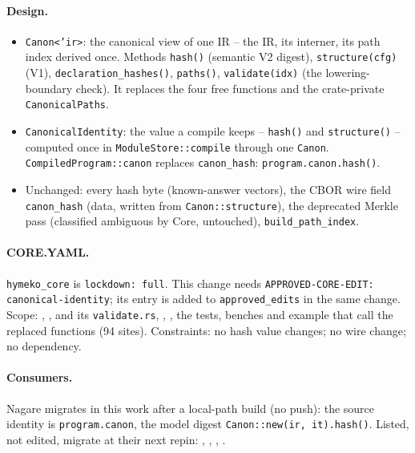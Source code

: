 \documentclass[11pt,a4paper]{article}
\begin{document}
\paragraph{Design.}
\begin{itemize}
\item \texttt{Canon<'ir>}: the canonical view of one IR -- the IR, its interner, its path index
  derived once. Methods \texttt{hash()} (semantic V2 digest), \texttt{structure(cfg)} (V1),
  \texttt{declaration\_hashes()}, \texttt{paths()}, \texttt{validate(idx)} (the lowering-boundary
  check). It replaces the four free functions and the crate-private \texttt{CanonicalPaths}.
\item \texttt{CanonicalIdentity}: the value a compile keeps -- \texttt{hash()} and
  \texttt{structure()} -- computed once in \texttt{ModuleStore::compile} through one \texttt{Canon}.
  \texttt{CompiledProgram::canon} replaces \texttt{canon\_hash}: \texttt{program.canon.hash()}.
\item Unchanged: every hash byte (known-answer vectors), the CBOR wire field \texttt{canon\_hash}
  (data, written from \texttt{Canon::structure}), the deprecated Merkle pass (classified ambiguous
  by Core, untouched), \texttt{build\_path\_index}.
\end{itemize}

\paragraph{CORE.YAML.} \texttt{hymeko\_core} is \texttt{lockdown: full}. This change needs
\texttt{APPROVED-CORE-EDIT: canonical-identity}; its entry is added to \texttt{approved\_edits} in the
same change. Scope: ,
,  and its \texttt{validate.rs},
, , the tests, benches and example that call
the replaced functions (94 sites). Constraints: no hash value changes; no wire change; no dependency.

\paragraph{Consumers.} Nagare migrates in this work after a local-path build (no push): the source
identity is \texttt{program.canon}, the model digest \texttt{Canon::new(ir, it).hash()}. Listed, not
edited, migrate at their next repin: ,
, ,
.
\end{document}
